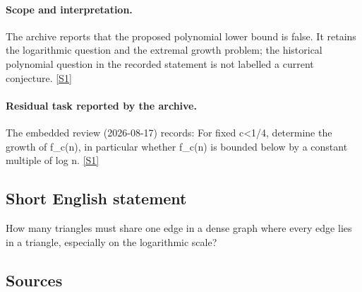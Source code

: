 \documentclass[11pt,a4paper]{article}
\newcommand{\sref}[2]{\hyperlink{source:#1:#2}{[S#2]}}
\begin{document}
\paragraph{Scope and interpretation.}

The archive reports that the proposed polynomial lower bound is false. It retains the logarithmic question and the extremal growth problem; the historical polynomial question in the recorded statement is not labelled a current conjecture. \sref{1916}{1}

\paragraph{Residual task reported by the archive.}

The embedded review (2026-08-17) records: For fixed c<1/4, determine the growth of f\_c(n), in particular whether f\_c(n) is bounded below by a constant multiple of log n. \sref{1916}{1}

\subsection{Short English statement}

How many triangles must share one edge in a dense graph where every edge lies in a triangle, especially on the logarithmic scale?

\subsection{Sources}
\end{document}
